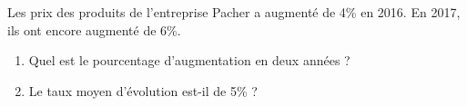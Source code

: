 
Les prix des produits de l'entreprise Pacher a augmenté de 4\% en 2016. En 2017, ils ont encore augmenté de 6\%.
\begin{enumerate}
\item Quel est le pourcentage d'augmentation en deux années ? 
\item Le taux moyen d'évolution est-il de 5\% ?
\end{enumerate} 